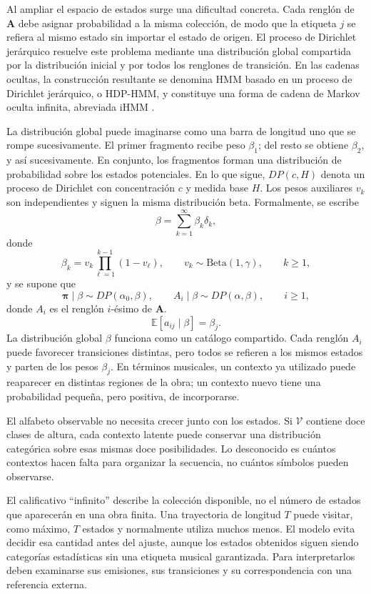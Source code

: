 Al ampliar el espacio de estados surge una dificultad concreta. Cada renglón de $\mathbf{A}$ debe asignar probabilidad a la misma colección, de modo que la etiqueta $j$ se refiera al mismo estado sin importar el estado de origen. El proceso de Dirichlet jerárquico resuelve este problema mediante una distribución global compartida por la distribución inicial y por todos los renglones de transición. En las cadenas ocultas, la construcción resultante se denomina HMM basado en un proceso de Dirichlet jerárquico, o HDP-HMM, y constituye una forma de cadena de Markov oculta infinita, abreviada iHMM \cite{beal2002,teh2006}.

La distribución global puede imaginarse como una barra de longitud uno que se rompe sucesivamente. El primer fragmento recibe peso $\beta_1$; del resto se obtiene $\beta_2$, y así sucesivamente. En conjunto, los fragmentos forman una distribución de probabilidad sobre los estados potenciales. En lo que sigue, $DP(c,H)$ denota un proceso de Dirichlet con concentración $c$ y medida base $H$. Los pesos auxiliares $v_k$ son independientes y siguen la misma distribución beta. Formalmente, se escribe
\[
\beta=\sum_{k=1}^{\infty}\beta_k\delta_k,
\]
donde
\[
\beta_k=v_k\prod_{\ell=1}^{k-1}(1-v_{\ell}),
\qquad
v_k \sim\mathrm{Beta}(1,\gamma),
\qquad k\geq 1,
\]
y se supone que
\[
\boldsymbol{\pi}\mid \beta \sim DP(\alpha_0,\beta),
\qquad
A_i\mid \beta \sim DP(\alpha,\beta), \qquad i\geq 1,
\]
donde $A_i$ es el renglón $i$-ésimo de $\mathbf{A}$.
\[
\mathbb{E}[a_{ij}\mid\beta]=\beta_j.
\]
La distribución global $\beta$ funciona como un catálogo compartido. Cada renglón $A_i$ puede favorecer transiciones distintas, pero todos se refieren a los mismos estados y parten de los pesos $\beta_j$. En términos musicales, un contexto ya utilizado puede reaparecer en distintas regiones de la obra; un contexto nuevo tiene una probabilidad pequeña, pero positiva, de incorporarse.

El alfabeto observable no necesita crecer junto con los estados. Si $\mathcal{V}$ contiene doce clases de altura, cada contexto latente puede conservar una distribución categórica sobre esas mismas doce posibilidades. Lo desconocido es cuántos contextos hacen falta para organizar la secuencia, no cuántos símbolos pueden observarse.

El calificativo ``infinito'' describe la colección disponible, no el número de estados que aparecerán en una obra finita. Una trayectoria de longitud $T$ puede visitar, como máximo, $T$ estados y normalmente utiliza muchos menos. El modelo evita decidir esa cantidad antes del ajuste, aunque los estados obtenidos siguen siendo categorías estadísticas sin una etiqueta musical garantizada. Para interpretarlos deben examinarse sus emisiones, sus transiciones y su correspondencia con una referencia externa.

